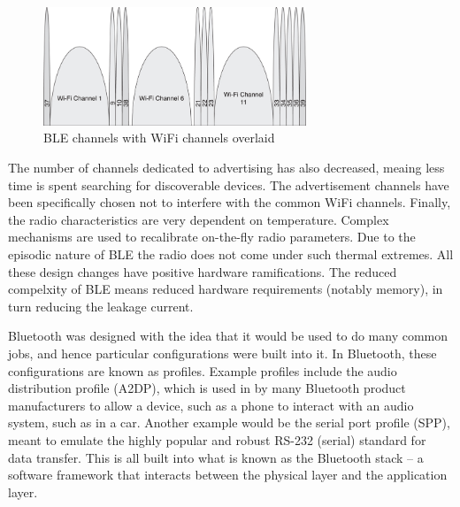 \documentclass[]{article}
\begin{document}
\begin{figure}[htb]
	\begin{center}
		\includegraphics[width = 0.7\textwidth]{blechannelswifi}
	\end{center}
	\caption{\ac{BLE} channels with WiFi channels overlaid}
	\label{fig:blechannelswifi}
\end{figure}


The number of channels dedicated to advertising has also decreased, meaing less time is spent searching for discoverable devices. The advertisement channels have been specifically chosen not to interfere with the common WiFi channels. Finally, the radio characteristics are very dependent on temperature. Complex mechanisms are used to recalibrate on-the-fly radio parameters. Due to the episodic nature of \ac{BLE} the radio does not come under such thermal extremes. All these design changes have positive hardware ramifications. The reduced compelxity of \ac{BLE} means reduced hardware requirements (notably memory), in turn reducing the leakage current.



Bluetooth was designed with the idea that it would be used to do many common jobs, and hence particular configurations were built into it. In Bluetooth, these configurations are known as profiles. Example profiles include the audio distribution profile (A2DP), which is used in by many Bluetooth product manufacturers to allow a device, such as a phone to interact with an audio system, such as in a car. Another example would be the serial port profile (SPP), meant to emulate the highly popular and robust RS-232 (serial) standard for data transfer. This is all built into what is known as the Bluetooth stack – a software framework that interacts between the physical layer and the application layer.  
\end{document}
